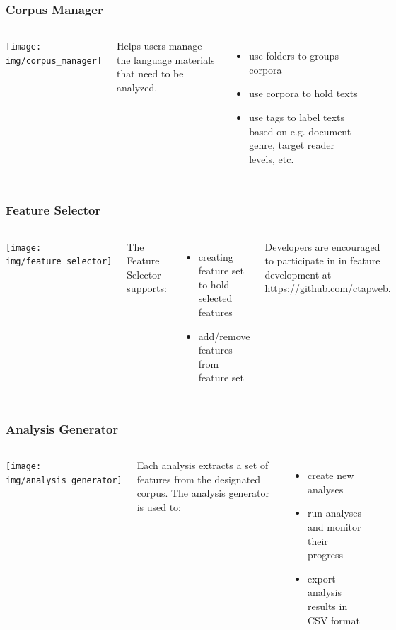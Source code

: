 \documentclass{beamer}
\begin{document}
	\begin{frame}
		\frametitle{Corpus Manager}

		\begin{columns}
				 \centering
				  \texttt{[image: img/corpus\_manager]}

				  Helps users manage the language materials that need to be
				  analyzed. 
				  \begin{itemize}
					  \item use folders to groups corpora
					  \item use corpora to hold texts
					  \item use tags to label texts based on e.g. document genre,
					  target reader levels, etc.
				  \end{itemize}

		\end{columns}
	\end{frame}

	\begin{frame}
		\frametitle{Feature Selector}

		\begin{columns}
			\column{0.4\textwidth}
				  \texttt{[image: img/feature\_selector]}

			\column{0.6\textwidth}
				The Feature Selector supports: 
				  \begin{itemize}
					  \item creating feature set to hold selected features
					  \item add/remove features from feature set
				  \end{itemize}

				  Developers are encouraged to participate in in feature
				  development at \url{https://github.com/ctapweb}.
		\end{columns}
	\end{frame}

	\begin{frame}
		\frametitle{Analysis Generator}

		\begin{columns}
			\column{0.4\textwidth}
				  \texttt{[image: img/analysis\_generator]}

			\column{0.6\textwidth}
				 Each analysis extracts a set of features from the designated
				 corpus. 
				 The analysis generator is used to:
				  \begin{itemize}
					  \item create new analyses
					  \item run analyses and monitor their progress
					  \item export analysis results in CSV format
				  \end{itemize}
		\end{columns}
	\end{frame}
\end{document}
